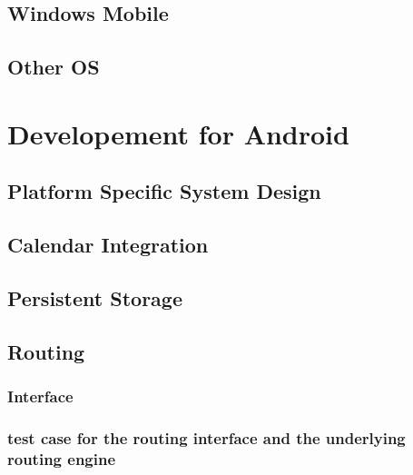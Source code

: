 \documentclass[11pt,a4paper]{scrreprt}
\begin{document}
\section{Windows Mobile} %
\label{sec:win_mobile}


\section{Other OS} %
\label{sec:other_os}


\chapter{Developement for Android} %
\label{chp:android}
%

\section{Platform Specific System Design} %
\label{sec:android_desing}


\section{Calendar Integration} %
\label{sec:android_calendar}


\section{Persistent Storage} %
\label{sec:android_pers_storage}


\section{Routing} %
\label{sec:android_routing}

\subsection{Interface} %
\label{sub:routing_interface}


\subsection{test case for the routing interface and the underlying routing engine}
\label{sub:routing_testcase}

\end{document}
